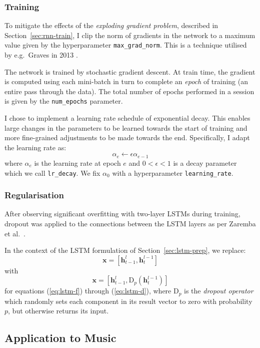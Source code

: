 \documentclass[12pt,a4paper,twoside,openright]{report}
\newcommand{\sref}[1]{Section~\ref{#1}}
\newcommand{\vect}[1]{\boldsymbol{\mathbf{#1}}}
\begin{document}
\subsubsection{Training}

To mitigate the effects of the \emph{exploding gradient problem}, described in
\sref{sec:rnn-train}, I clip the norm of gradients in the network to a
maximum value given by the hyperparameter \texttt{max\_grad\_norm}. This is a
technique utilised by e.g.\ Graves in 2013 \cite{graves2013generating}.

The network is trained by stochastic gradient descent. At train time, the
gradient is computed using each mini-batch in turn to complete an \emph{epoch}
of training (an entire pass through the data). The total number of epochs
performed in a session is given by the \texttt{num\_epochs} parameter.

I chose to implement a learning rate schedule of exponential decay. This enables
large changes in the parameters to be learned towards the start of training and
more fine-grained adjustments to be made towards the end. Specifically, I adapt
the learning rate as:
$$ \alpha_e \gets \epsilon\alpha_{e-1} $$
where $\alpha_e$ is the learning rate at epoch $e$ and $0 < \epsilon < 1$ is a
decay parameter which we call \texttt{lr\_decay}. We fix $\alpha_0$ with a
hyperparameter \texttt{learning\_rate}.

\subsubsection{Regularisation}

After observing significant overfitting with two-layer LSTMs during training,
dropout was applied to the connections between the LSTM layers as per Zaremba et
al.\ \cite{zaremba2014recurrent}.

In the context of the LSTM formulation of \sref{sec:lstm-prep}, we
replace:
$$ \vect{x} = [\vect{h}_{t-1}^l, \vect{h}_t^{l-1}] $$
with
$$ \vect{x} = [\vect{h}_{t-1}^l, \mathrm{D}_p(\vect{h}_t^{l-1})] $$
for equations (\ref{eq:lstm-f}) through (\ref{eq:lstm-d}), where $\mathrm{D}_p$
is the \emph{dropout operator} which randomly sets each component in its result
vector to zero with probability $p$, but otherwise returns its input. 

\subsection{Application to Music}
\end{document}

